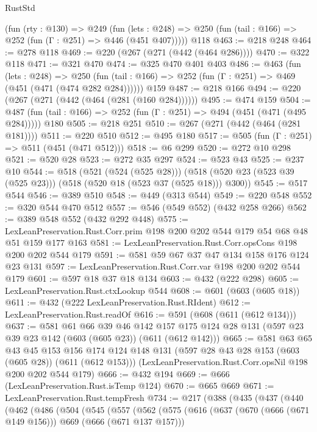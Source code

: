 \begin{lexlean}{RustStd}
\begin{coremodule}
    (fun (rty : @130) =>
    @249
      (fun (lets : @248) => @250 (fun (tail : @166) => @252 (fun (Γ : @251) => @446 (@451 @407)))))
    @118
@463 := @218 @248
@464 := @278 @118
@469 := @220 (@267 (@271 (@442 (@464 @286))))
@470 := @322 @118
@471 := @321 @470
@474 := @325 @470 @401 @403
@486 := @463
    (fun (lets : @248) =>
    @250 (fun (tail : @166) => @252 (fun (Γ : @251) => @469 (@451 (@471 (@474 @282 @284))))))
    @159
@487 := @218 @166
@494 := @220 (@267 (@271 (@442 (@464 (@281 (@160 @284))))))
@495 := @474 @159
@504 := @487 (fun (tail : @166) => @252 (fun (Γ : @251) => @494 (@451 (@471 (@495 @284))))) @180
@505 := @218 @251
@510 := @267 (@271 (@442 (@464 (@281 @181))))
@511 := @220 @510
@512 := @495 @180
@517 := @505 (fun (Γ : @251) => @511 (@451 (@471 @512)))
@518 := @6 @299
@520 := @272 @10 @298
@521 := @520 @28
@523 := @272 @35 @297
@524 := @523 @43
@525 := @237 @10
@544 := @518
    (@521 (@524 (@525 @28)))
    (@518 (@520 @23 (@523 @39 (@525 @23))) (@518 (@520 @18 (@523 @37 (@525 @18))) @300))
@545 := @517 @544
@546 := @389 @510
@548 := @449 (@313 @544)
@549 := @220 @548
@552 := @320 @544 @470 @512
@557 := @546 (@549 @552) (@432 @258 @266)
@562 := @389 @548 @552 (@432 @292 @448)
@575 := LexLeanPreservation.Rust.Corr.prim @198 @200 @202 @544 @179 @54 @68 @48 @51 @159 @177 @163
@581 := LexLeanPreservation.Rust.Corr.opsCons @198 @200 @202 @544 @179
@591 := @581 @59 @67 @37 @47 @134 @158 @176 @124 @23 @131
@597 := LexLeanPreservation.Rust.Corr.var @198 @200 @202 @544 @179
@601 := @597 @18 @37 @18 @134
@603 := @432 (@222 @298)
@605 := LexLeanPreservation.Rust.ctxLookup @544
@608 := @601 (@603 (@605 @18))
@611 := @432 (@222 LexLeanPreservation.Rust.RIdent)
@612 := LexLeanPreservation.Rust.readOf
@616 := @591 (@608 (@611 (@612 @134)))
@637 := @581
    @61
    @66
    @39
    @46
    @142
    @157
    @175
    @124
    @28
    @131
    (@597 @23 @39 @23 @142 (@603 (@605 @23)) (@611 (@612 @142)))
@665 := @581
    @63
    @65
    @43
    @45
    @153
    @156
    @174
    @124
    @148
    @131
    (@597 @28 @43 @28 @153 (@603 (@605 @28)) (@611 (@612 @153)))
    (LexLeanPreservation.Rust.Corr.opsNil @198 @200 @202 @544 @179)
@666 := @432 @194
@669 := @666 (LexLeanPreservation.Rust.isTemp @124)
@670 := @665 @669
@671 := LexLeanPreservation.Rust.tempFresh
@734 := @217
    (@388
      (@435
        (@437
          (@440
            (@462
              (@486
                (@504
                  (@545
                    (@557
                      (@562
                        (@575
                          (@616
                            (@637 (@670 (@666 (@671 @149 @156))) @669 (@666 (@671 @137 @157)))

\end{coremodule}
\end{lexlean}
